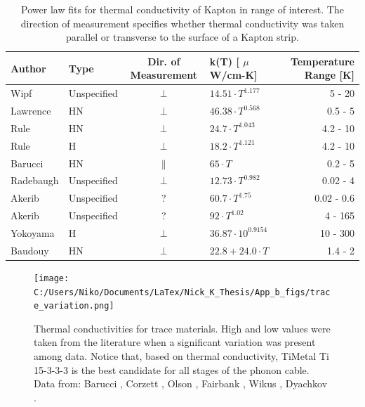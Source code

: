 \documentclass{report}
\begin{document}
\begin{table}[h]
\centering
{}
\begin{threeparttable}
\begin{tabular}{llclr}
\toprule
Author & Type & Dir. of Measurement & k(T) [ $\mu$W/cm-K] & Temperature Range [K]\\
\midrule
Wipf \cite{wip} & Unspecified & $\perp$ & $14.51 \cdot T^{1.177}$ & 5 - 20 \\
Lawrence \cite{law} & HN & $\perp$ & $46.38 \cdot T^{0.568}$ & 0.5 - 5 \\
Rule \cite{Rule1996} & HN & $\perp$ & $24.7 \cdot T^{1.043}$ & 4.2 - 10 \\
Rule \cite{Rule1996} & H & $\perp$ & $18.2 \cdot T^{1.121}$ & 4.2 - 10 \\
Barucci \cite{bar} & HN & $\parallel$ & $65 \cdot T$ & 0.2 - 5 \\
Radebaugh \cite{rad73} & Unspecified & $\perp$ & $12.73 \cdot T^{0.982}$ & 0.02 - 4 \\
Akerib \cite{Akerib} & Unspecified & ? & $60.7 \cdot T^{1.75}$ & 0.02 - 0.6  \\
Akerib \cite{Akerib}& Unspecified & ? & $92 \cdot T^{1.02}$ & 4 - 165 \\
Yokoyama \cite{yok} & H & $\perp$ & $36.87 \cdot 10^{0.9154}$ & 10 - 300 \\
Baudouy \cite{Baudouy2003} & HN & $\perp$ & $22.8 + 24.0 \cdot T$ & 1.4 - 2 \\
\bottomrule
\end{tabular}
\caption{Power law fits for thermal conductivity of Kapton in range of interest. The direction of measurement specifies whether thermal conductivity was taken parallel or transverse to the surface of a Kapton strip.}
\end{threeparttable}
\end{table}

\begin{figure}[h]
\centering
\texttt{[image: C:/Users/Niko/Documents/LaTex/Nick\_K\_Thesis/App\_b\_figs/trace\_variation.png]}
\caption{Thermal conductivities for trace materials. High and low values were taken from the literature when a significant variation was present among data. Notice that, based on thermal conductivity, TiMetal Ti 15-3-3-3 is the best candidate for all stages of the phonon cable. Data from: Barucci \cite{Barucci2008}, Corzett \cite{cor}, Olson \cite{ols}, Fairbank \cite{fair}, Wikus \cite{wik}, Dyachkov \cite{dya}.}
\end{figure}
\end{document}
